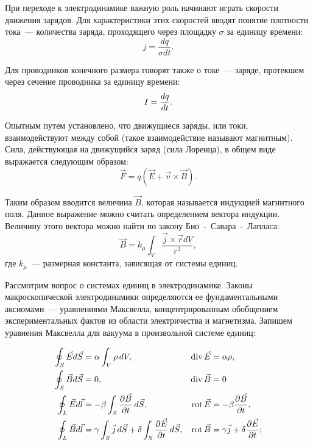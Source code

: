При переходе к электродинамике важную роль начинают играть скорости движения зарядов. Для характеристики этих скоростей вводят понятие плотности тока~--- количества заряда, проходящего через площадку $\sigma$ за единицу времени:
\begin{equation}
	j = \frac{dq}{\sigma dt}.
\end{equation}

Для проводников конечного размера говорят также о токе~--- заряде, протекшем через сечение проводника за единицу времени:
\begin{equation}
	\eqmark{current}
	I = \frac{dq}{dt}.
\end{equation}

Опытным путем установлено, что движущиеся заряды, или токи, взаимодействуют между собой (такое взаимодействие называют магнитным). Сила, действующая на движущийся заряд (сила Лоренца), в общем виде выражается следующим образом:
\begin{equation}
	\vec{F} = q \left( \vec{E} + \vec{v} \times \vec{B} \right).
\end{equation}

Таким образом вводится величина $\vec{B}$, которая называется индукцией магнитного поля. Данное выражение можно считать определением вектора индукции. Величину этого вектора можно найти по закону Био~-~Савара~-~Лапласа:
\begin{equation}
	\vec{B} = k_{\mu}\int_{V}{\frac{\vec{j} \times \vec{r} dV}{r^3}},
\end{equation}
где $k_{\mu}$~--- размерная константа, зависящая от системы единиц.


Рассмотрим вопрос о системах единиц в электродинамике. Законы макроскопической электродинамики определяются ее фундаментальными аксиомами~--- уравнениями Максвелла, концентрированным обобщением экспериментальных фактов из области электричества и магнетизма. Запишем уравнения Максвелла для вакуума в произвольной системе единиц:



\begin{gather}
	\eqmark{maxwell}
	\begin{aligned}
		\oint_S \vec{E}d\vec{S} &= \alpha\int_V\rho\,dV, & \Div \vec{E} &= \alpha\rho,\\
		\oint_S\vec{B}d\vec{S} &= 0, & \Div\vec{B} &= 0\\
		\oint_L\vec{E}d\vec{l} &= -\beta\int_S\frac{\partial{\vec{B}}} {\partial t}\,d\vec{S}, & \Rot\vec{E} &= -\beta\frac{\partial\vec B}{\partial t},\\
		\oint_L\vec{B}d\vec{l} &= \gamma\int_S\vec{j}\,d\vec{S}+\delta\int_S\frac{\partial{\vec{E}}}{\partial t}\,d\vec{S}, & \Rot\vec{B} &= \gamma\vec{j}+\delta\frac{\partial\vec E}{\partial t};
	\end{aligned}
\end{gather}

